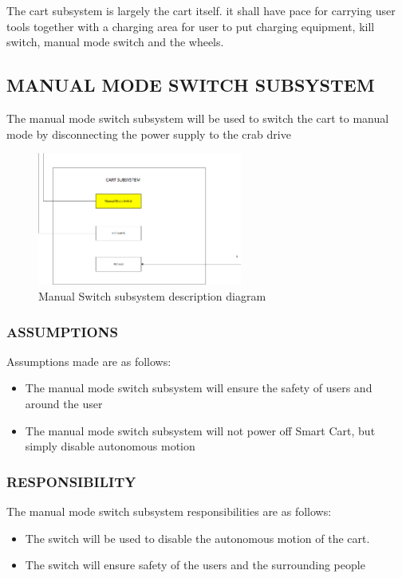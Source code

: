 The cart subsystem is largely the cart itself. it shall have pace for carrying user tools together with a charging area for user to put charging equipment, kill switch, manual mode switch and the wheels.

\subsection{MANUAL MODE SWITCH SUBSYSTEM}
The manual mode switch subsystem will be used to switch the cart to manual mode by disconnecting the power supply to the crab drive
\begin{figure}[h!]
	\centering
 	\includegraphics[width=0.60\textwidth]{images/manualmodeswitch}
 \caption{Manual Switch subsystem description diagram}
\end{figure}

\subsubsection{ASSUMPTIONS}
Assumptions made are as follows:
\begin{itemize}
\item The manual mode switch subsystem will ensure the safety of users and around the user
\item The manual mode switch subsystem will not power off Smart Cart, but simply disable autonomous motion  
\end{itemize} 

\subsubsection{RESPONSIBILITY}
The manual mode switch subsystem responsibilities are as follows:
\begin{itemize}
\item The switch will be used to disable the autonomous motion of the cart.
\item The switch will ensure safety of the users and the surrounding people
\end{itemize}

